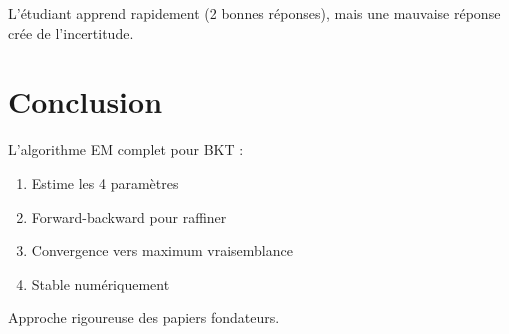 \documentclass[12pt]{article}
\begin{document}
L'étudiant apprend rapidement (2 bonnes réponses), mais une mauvaise réponse crée de l'incertitude.

\section{Conclusion}

L'algorithme EM complet pour BKT :

\begin{enumerate}
    \item Estime les 4 paramètres
    \item Forward-backward pour raffiner
    \item Convergence vers maximum vraisemblance
    \item Stable numériquement
\end{enumerate}

Approche rigoureuse des papiers fondateurs.
\end{document}
